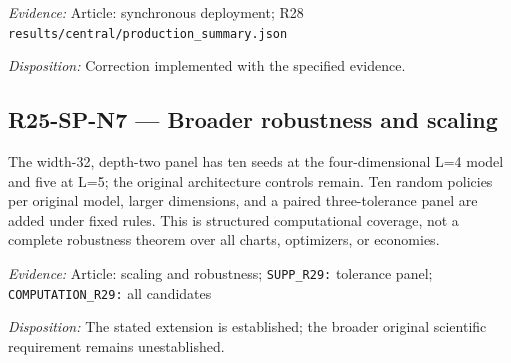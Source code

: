 \emph{Evidence:} Article: synchronous deployment; R28 \nolinkurl{results/central/production_summary.json}

\emph{Disposition:} Correction implemented with the specified evidence.
\subsection{R25-SP-N7 --- Broader robustness and scaling}
The width-32, depth-two panel has ten seeds at the four-dimensional L=4 model and five at L=5; the original architecture controls remain. Ten random policies per original model, larger dimensions, and a paired three-tolerance panel are added under fixed rules. This is structured computational coverage, not a complete robustness theorem over all charts, optimizers, or economies.

\emph{Evidence:} Article: scaling and robustness; \nolinkurl{SUPP_R29:} tolerance panel; \nolinkurl{COMPUTATION_R29:} all candidates

\emph{Disposition:} The stated extension is established; the broader original scientific requirement remains unestablished.

